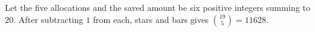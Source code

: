 Let the five allocations and the saved amount be six positive integers summing to $20$. After subtracting $1$ from each, stars and bars gives $\binom{19}{5}=\boxed{11628}$.
